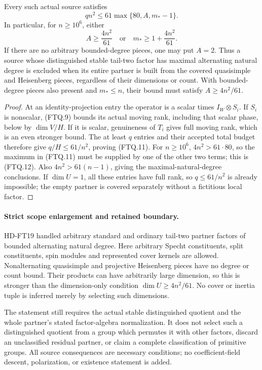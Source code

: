 \begin{theorem}[HD-FT22]
Every such actual source satisfies
\[
                   qn^2\le61\max\{80,A,m_*-1\}.
 \tag{FTQ.11}
\]
In particular, for \(n\ge10^6\), either
\[
             A\ge\frac{4n^2}{61}
       \quad\text{or}\quad
             m_*\ge1+\frac{4n^2}{61}.
 \tag{FTQ.12}
\]
If there are no arbitrary bounded-degree pieces, one may put
\(A=2\).  Thus a source whose distinguished stable tail-two factor
has maximal alternating natural degree is excluded when its entire
partner is built from the covered quasisimple and Heisenberg pieces,
regardless of their dimensions or count.  With bounded-degree pieces
also present and \(m_*\le n\), their bound must satisfy
\(A\ge4n^2/61\).
\end{theorem}

\begin{proof}
At an identity-projection entry the operator is a scalar times
\(I_W\otimes S_i\).  If \(S_i\) is nonscalar, (FTQ.9) bounds its
actual moving rank, including that scalar phase, below by
\(\dim V/H\).  If it is scalar, genuineness of \(T_i\) gives
full moving rank, which is an even stronger bound.  The at least
\(q\) entries and their accepted total budget therefore give
\(q/H\le61/n^2\), proving (FTQ.11).
For \(n\ge10^6\), \(4n^2>61\cdot80\), so the maximum in
(FTQ.11) must be supplied by one of the other two terms; this is
(FTQ.12).  Also \(4n^2>61(n-1)\), giving the maximal-natural-degree
conclusions.  If \(\dim U=1\), all these entries have full rank,
so \(q\le61/n^2\) is already impossible; the empty partner is
covered separately without a fictitious local factor.
\end{proof}

\paragraph{Strict scope enlargement and retained boundary.}
HD-FT19 handled arbitrary standard and ordinary tail-two partner
factors of bounded alternating natural degree.  Here arbitrary
Specht constituents, split constituents, spin modules and represented
cover kernels are allowed.  Nonalternating quasisimple and projective
Heisenberg pieces have no degree or count bound.  Their products
can have arbitrarily large dimension, so this is stronger than the
dimension-only condition \(\dim U\ge4n^2/61\).  No cover or inertia
tuple is inferred merely by selecting such dimensions.

The statement still requires the actual stable distinguished
quotient and the whole partner's stated factor-algebra normalization.
It does not select such a distinguished quotient from a group which
permutes it with other factors, discard an unclassified residual
partner, or claim a complete classification of primitive groups.
All source consequences are necessary conditions; no coefficient-field
descent, polarization, or existence statement is added.

